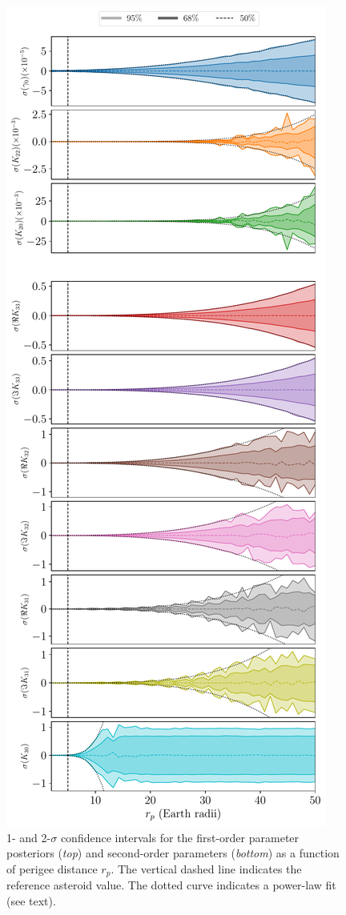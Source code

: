 \documentclass[fleqn,usenatbib]{mnras}
\begin{document}
\begin{figure}
  \centering
  \includegraphics[height=0.89\textheight]{figs/scan-perigee.pdf}
  \caption{1- and 2-$\sigma$ confidence intervals for the first-order parameter posteriors (\textit{top}) and second-order parameters (\textit{bottom}) as a function of perigee distance $r_p$. The vertical dashed line indicates the reference asteroid value. The dotted curve indicates a power-law fit (see text).}
  \label{fig:scan-perigee}
\end{figure}
\end{document}
